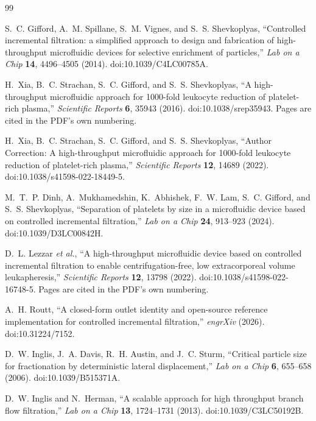 \begin{thebibliography}{99}

S.~C. Gifford, A.~M. Spillane, S.~M. Vignes, and S.~S. Shevkoplyas,
``Controlled incremental filtration: a simplified approach to design and fabrication of
high-throughput microfluidic devices for selective enrichment of particles,''
\emph{Lab on a Chip} \textbf{14}, 4496--4505 (2014). doi:10.1039/C4LC00785A.

H.~Xia, B.~C. Strachan, S.~C. Gifford, and S.~S. Shevkoplyas,
``A high-throughput microfluidic approach for 1000-fold leukocyte reduction of platelet-rich plasma,''
\emph{Scientific Reports} \textbf{6}, 35943 (2016). doi:10.1038/srep35943. Pages are cited in the
PDF's own numbering.

H.~Xia, B.~C. Strachan, S.~C. Gifford, and S.~S. Shevkoplyas,
``Author Correction: A high-throughput microfluidic approach for 1000-fold leukocyte reduction of
platelet-rich plasma,'' \emph{Scientific Reports} \textbf{12}, 14689 (2022).
doi:10.1038/s41598-022-18449-5.

M.~T.~P. Dinh, A.~Mukhamedshin, K.~Abhishek, F.~W. Lam, S.~C. Gifford, and S.~S. Shevkoplyas,
``Separation of platelets by size in a microfluidic device based on controlled incremental filtration,''
\emph{Lab on a Chip} \textbf{24}, 913--923 (2024). doi:10.1039/D3LC00842H.

D.~L. Lezzar \emph{et al.},
``A high-throughput microfluidic device based on controlled incremental filtration to enable
centrifugation-free, low extracorporeal volume leukapheresis,''
\emph{Scientific Reports} \textbf{12}, 13798 (2022). doi:10.1038/s41598-022-16748-5. Pages are
cited in the PDF's own numbering.

A.~H. Routt,
``A closed-form outlet identity and open-source reference implementation for controlled incremental filtration,''
\emph{engrXiv} (2026). doi:10.31224/7152.

D.~W. Inglis, J.~A. Davis, R.~H. Austin, and J.~C. Sturm,
``Critical particle size for fractionation by deterministic lateral displacement,''
\emph{Lab on a Chip} \textbf{6}, 655--658 (2006). doi:10.1039/B515371A.

D.~W. Inglis and N.~Herman,
``A scalable approach for high throughput branch flow filtration,''
\emph{Lab on a Chip} \textbf{13}, 1724--1731 (2013). doi:10.1039/C3LC50192B.


\end{thebibliography}
